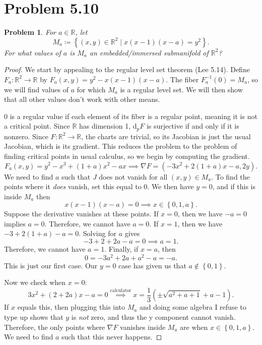 \documentclass[11pt, letterpaper]{article}
\theoremstyle{plain}
\newtheorem{problem}{Problem}[section]
\begin{document}
\section{Problem 5.10}
\begin{problem}
	For $a\in\mathbb{R} $, let
	\[
		M_a\coloneqq \left\{ (x,y)\in\mathbb{R} ^2\mid x(x-1)(x-a)=y^2 \right\} 
	.\]
	For what values of $a$ is $M_a$ an embedded/immersed submanifold of $\mathbb{R} ^2$?
\end{problem}
\begin{proof}
	We start by appealing to the regular level set theorem (Lee 5.14). Define $F_a : \mathbb{R} ^2 \to \mathbb{R} $ by $F_a(x,y)=y^2-x(x-1)(x-a)$. The fiber $F_a^{-1} (0)=M_a$, so we will find values of $a$ for which $M_a$ is a regular level set. We will then show that all other values don't work with other means.

	0 is a regular value if each element of its fiber is a regular point, meaning it is not a critical point. Since $\mathbb{R} $ has dimension 1, $\mathrm{d}_pF$ is surjective if and only if it is nonzero. Since $F : \mathbb{R} ^2 \to \mathbb{R} $, the charts are trivial, so its Jacobian is just the usual Jacobian, which is its gradient. This reduces the problem to the problem of finding critical points in usual calculus, so we begin by computing the gradient.
	\[
		F_a(x,y)=y^2-x^3+(1+a)x^2-ax\implies \nabla F=(-3x^2+2(1+a)x-a,2y)
	.\]
	We need to find $a$ such that $J$ does not vanish for all $(x,y)\in M_a$. To find the points where it \emph{does} vanish, set this equal to 0. We then have $y=0$, and if this is inside $M_a$ then
	\[
		x(x-1)(x-a)=0 \implies x\in \left\{ 0,1,a \right\} 
	.\]
	Suppose the derivative vanishes at these points. If $x=0$, then we have $-a=0$ implies $a=0$. Therefore, we cannot have $a=0$. If $x=1$, then we have $-3+2(1+a)-a=0$. Solving for $a$ gives
	\[
		-3+2+2a-a=0 \implies a=1
	.\]
	Therefore, we cannot have $a=1$. Finally, if $x=a$, then
	\[
		0=-3a^2+2a+a^2-a=-a
	.\]
	This is just our first case. Our $y=0$ case has given us that $a \notin \left\{ 0,1 \right\} $.

	Now we check when $x=0$:
	\[
		3x^2+(2+2a)x-a=0 \overset {\text{calculator}}{\implies } x=\frac{1}{3} \left( \pm \sqrt{a^2+a+1} +a-1 \right) 
	.\]
	If $x$ equals this, then plugging this into $M_a$ and doing some algebra I refuse to type up shows that $y$ is \emph{not} zero, and thus the y component cannot vanish. Therefore, the only points where $\nabla F$ vanishes inside $M_a$ are when $x\in \left\{ 0,1,a \right\} $. We need to find $a$ such that this never happens.


\end{proof}
\end{document}
